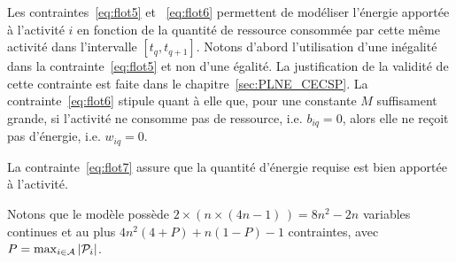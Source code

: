 Les contraintes~\eqref{eq:flot5} et ~\eqref{eq:flot6} permettent de
modéliser l’énergie apportée à l’activité $i$ en fonction de la
quantité de ressource consommée par cette même activité dans
l’intervalle $[t_q , t_{q+1}]$. Notons d’abord l’utilisation d’une
inégalité dans la contrainte~\eqref{eq:flot5} et non d’une égalité. La
justification de la validité de cette contrainte est faite dans le 
chapitre~\ref{sec:PLNE_CECSP}. La contrainte~\eqref{eq:flot6}
stipule quant à elle que, pour une constante $M$ suffisament grande,
si l'activité ne consomme pas de ressource, i.e. $b_{iq}=0$, alors
elle ne reçoit pas d'énergie, i.e. $w_{iq}=0$.

La contrainte~\eqref{eq:flot7} assure que la quantité d'énergie
requise est bien apportée à l'activité. 

Notons que le modèle possède $2 \times (n \times (4n - 1)\,) = 8n^2 -
2n$ variables continues et au plus $4n^2(4+P) + n (1 -
P) - 1$ contraintes, avec $P=\max_{i\in{\cal A}}|{\cal P}_i|$.

